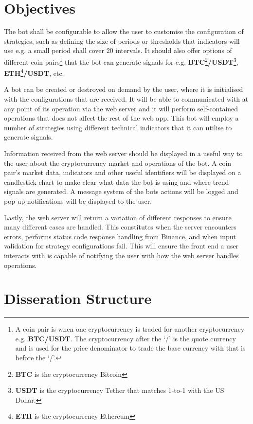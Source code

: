 \section{Objectives}
\label{sec:intro:objectives}
\noindent The bot shall be configurable to allow the user to customise the configuration of strategies, such as defining the size of periods or thresholds that indicators will use e.g. a small period shall cover 20 intervals. It should also offer options of different coin pairs\footnote{A coin pair is when one cryptocurrency is traded for another cryptocurrency e.g. \textbf{BTC/USDT}. The cryptocurrency after the `/' is the quote currency and is used for the price denominator to trade the base currency with that is before the `/'.} that the bot can generate signals for e.g. \textbf{BTC}\footnote{\textbf{BTC} is the cryptocurrency Bitcoin}\textbf{/USDT}\footnote{\textbf{USDT} is the cryptocurrency Tether that matches 1-to-1 with the US Dollar.}, \textbf{ETH}\footnote{\textbf{ETH} is the cryptocurrency Ethereum}\textbf{/USDT}, etc.

A bot can be created or destroyed on demand by the user, where it is initialised with the configurations that are received. It will be able to communicated with at any point of its operation via the web server and it will perform self-contained operations that does not affect the rest of the web app. This bot will employ a number of strategies using different technical indicators that it can utilise to generate signals.

Information received from the web server should be displayed in a useful way to the user about the cryptocurrency market and operations of the bot. A coin pair's market data, indicators and other useful identifiers will be displayed on a candlestick chart to make clear what data the bot is using and where trend signals are generated. A message system of the bots actions will be logged and pop up notifications will be displayed to the user.

Lastly, the web server will return a variation of different responses to ensure many different cases are handled. This constitutes when the server encounters errors, performs status code response handling from Binance, and when input validation for strategy configurations fail. This will ensure the front end a user interacts with is capable of notifying the user with how the web server handles operations.



\section{Disseration Structure}
\label{sec:intro:structure}

